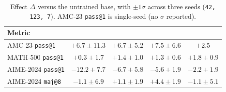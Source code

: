 \begin{table}[t]
\centering\small
\caption{Effect $\Delta$ versus the untrained base, with $\pm 1\sigma$ across
three seeds (\texttt{42, 123, 7}). \armD{} AMC-23 \texttt{pass@1} is
single-seed (no $\sigma$ reported).}
\label{tab:delta_v2}
\begin{tabular}{lcccc}
\toprule
Metric & \armA{} & \armB{} & \armC{} & \armD{} \\
\midrule
AMC-23 \texttt{pass@1}      & $+6.7\pm 11.3$ & $+6.7\pm 5.2$ & $+7.5\pm 6.6$ & $+2.5$ \\
MATH-500 \texttt{pass@1}    & $+0.3\pm 1.7$  & $+1.4\pm 1.0$ & $+1.3\pm 0.6$ & $+1.8\pm 0.9$ \\
AIME-2024 \texttt{pass@1}   & $-12.2\pm 7.7$ & $-6.7\pm 5.8$ & $-5.6\pm 1.9$ & $-2.2\pm 1.9$ \\
AIME-2024 \texttt{maj@8}    & $-1.1\pm 6.9$  & $+1.1\pm 1.9$ & $+4.4\pm 1.9$ & $-1.1\pm 5.1$ \\
\bottomrule
\end{tabular}
\end{table}
